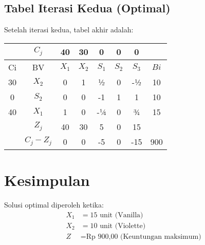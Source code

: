 \documentclass[12pt,a4paper]{article}
\begin{document}
\subsection*{Tabel Iterasi Kedua (Optimal)}
Setelah iterasi kedua, tabel akhir adalah:
\begin{center}
\begin{tabular}{|c|c|c|c|c|c|c|c|}
\hline
 & $C_j$ & 40 & 30 & 0 & 0 & 0 & \\
\hline
Ci & BV & $X_1$ & $X_2$ & $S_1$ & $S_2$ & $S_3$ & $Bi$ \\
\hline
30 & $X_2$ & 0 & 1 & ½ & 0 & -½ & 10 \\
0 & $S_2$ & 0 & 0 & -1 & 1 & 1 & 10 \\
40 & $X_1$ & 1 & 0 & -¼ & 0 & ¾ & 15 \\
\hline
 & $Z_j$ & 40 & 30 & 5 & 0 & 15 & \\
\hline
 & $C_j-Z_j$ & 0 & 0 & -5 & 0 & -15 & 900 \\
\hline
\end{tabular}
\end{center}

\section*{Kesimpulan}
Solusi optimal diperoleh ketika:
\[
\begin{aligned}
X_1 &= 15 \text{ unit (Vanilla)} \\
X_2 &= 10 \text{ unit (Violette)} \\
Z &= \text{Rp 900,00 (Keuntungan maksimum)}
\end{aligned}
\]
\end{document}
